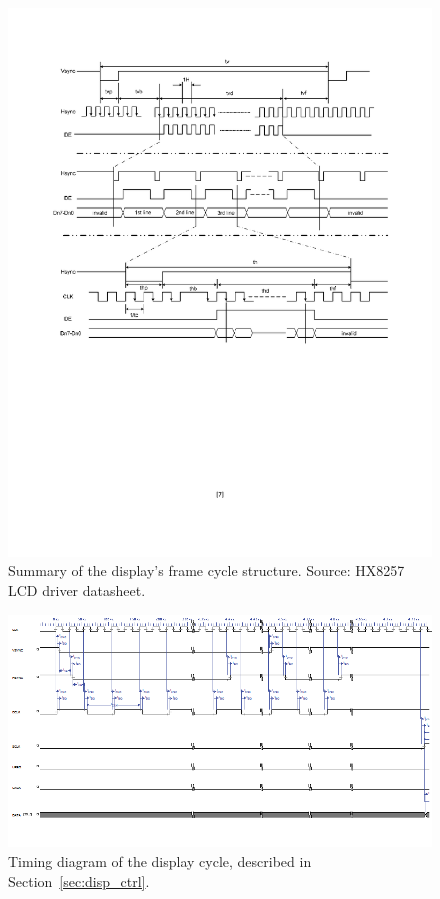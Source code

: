\documentclass[titlepage]{scrartcl}
\begin{document}
	\begin{figure}[h!]
	\centerline{\includegraphics[width=20cm]{img/display_datasheet_diagram.pdf}}
		\vspace{-2cm}
                	\caption{Summary of the display's frame cycle structure. Source: HX8257 LCD driver datasheet.}
               	\label{fig:disp_timing_datasheet}
	\end{figure}

	\begin{figure}[h!]
	\vspace{-2cm}
	\centerline{\includegraphics[width=25cm, angle=90, origin=c]{img/display1.png}}
		\vspace{1cm}
                	\caption{Timing diagram of the display cycle, described in Section~\ref{sec:disp_ctrl}.}
               	\label{fig:disp_timing}
	\end{figure}
\end{document}
